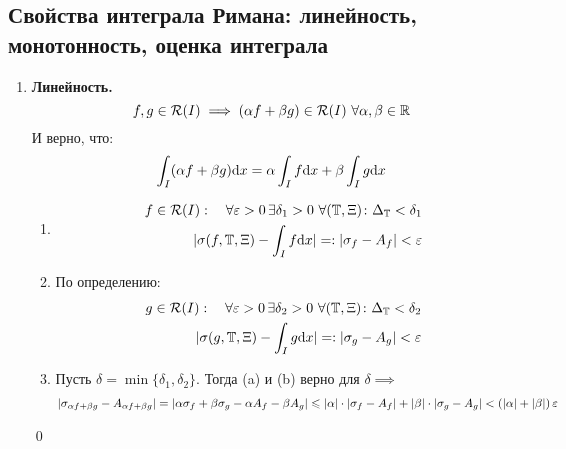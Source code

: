 \documentclass[a4paper]{article}
\begin{document}
\subsection{Свойства интеграла Римана: линейность, монотонность, оценка интеграла}
\begin{enumerate}
    \item \textbf{Линейность.}
    \begin{equation*}
        f, g \in \mathcal{R}(I) \implies (\alpha f + \beta g)\in \mathcal{R}(I)\ \forall \alpha, \beta \in \operatorname{\mathbb{R}}
    \end{equation*}
    И верно, что:
    \begin{equation*}
            \int_I(\alpha f + \beta g)\text{d}x = \alpha\int_I f\text{d}x + \beta\int_Ig\text{d}x
    \end{equation*}
\proof 
\begin{enumerate}
    \item
\begin{equation*}
\begin{aligned}
    f\in \mathcal{R}(I): \quad \forall \varepsilon > 0 \, \exists\delta_1>0\ \forall(\operatorname{\mathbb{T}},\Xi)\colon \Delta_{\operatorname{\mathbb{T}}} < \delta_1 \\
    |\sigma(f, \operatorname{\mathbb{T}}, \Xi)  - \int_If\text{d}x| =: |\sigma_f - A_f| <\varepsilon
\end{aligned}
\end{equation*}
\item По определению:
\begin{equation*}
    \begin{aligned}
        g\in \mathcal{R}(I): \quad \forall \varepsilon > 0 \, \exists\delta_2>0\ \forall(\operatorname{\mathbb{T}},\Xi)\colon \Delta_{\operatorname{\mathbb{T}}} < \delta_2\\
|\sigma(g, \operatorname{\mathbb{T}}, \Xi)  - \int_Ig\text{d}x| =: |\sigma_g - A_g| < \varepsilon
    \end{aligned}
\end{equation*}
\item Пусть $\delta = \min\{\delta_1, \delta_2\}$. Тогда (a) и (b) верно для $\delta \implies$
\begin{equation*}
    \begin{aligned}
        |\sigma_{\alpha f+\beta g} - A_{\alpha f+ \beta g}| = |\alpha\sigma_f + \beta\sigma_g - \alpha A_f - \beta A_g| \leqslant
        |\alpha|\cdot|\sigma_f - A_f| + |\beta|\cdot|\sigma_g-A_g| < (|\alpha|+|\beta|)\operatorname{\varepsilon} 
    \end{aligned}
\end{equation*}
\end{enumerate}
\qed


\end{enumerate}
\end{document}
